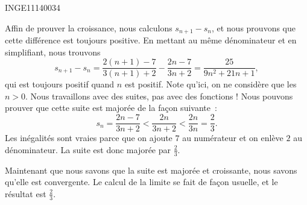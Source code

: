 

\begin{corrige}{INGE11140034}

	Affin de prouver la croissance, nous calculons $s_{n+1}-s_n$, et nous prouvons que cette différence est toujours positive. En mettant au même dénominateur et en simplifiant, nous trouvons
	\begin{equation}
		s_{n+1}-s_n=\frac{ 2(n+1)-7 }{ 3(n+1)+2 }-\frac{ 2n-7 }{ 3n+2 }=\frac{ 25 }{ 9n^2+21n+1 },
	\end{equation}
	qui est toujours positif quand $n$ est positif. Note qu'ici, on ne considère que les $n>0$. Nous travaillons avec des suites, pas avec des fonctions !
	Nous pouvons prouver que cette suite est majorée de la façon suivante~:
	\begin{equation}
		s_n=\frac{ 2n-7 }{ 3n+2 }<\frac{ 2n }{ 3n+2 }<\frac{ 2n }{ 3n }=\frac{ 2 }{ 3 }.
	\end{equation}
	Les inégalités sont vraies parce que on ajoute $7$ au numérateur et on enlève $2$ au dénominateur. La suite est donc majorée par $\frac{ 2 }{ 3 }$.

	Maintenant que nous savons que la suite est majorée et croissante, nous savons qu'elle est convergente. Le calcul de la limite se fait de façon usuelle, et le résultat est $\frac{ 2 }{ 3 }$.

\end{corrige}
